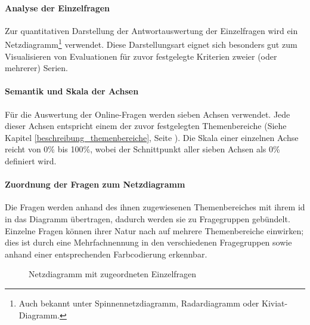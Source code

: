 \documentclass[../../main.tex]{subfiles}
\begin{document}
\paragraph*{Analyse der Einzelfragen}\mbox{}

\begin{sloppypar}
Zur quantitativen Darstellung der Antwortauswertung der Einzelfragen wird ein Netzdiagramm\footnote{Auch bekannt unter Spinnennetzdiagramm, Radardiagramm oder Kiviat-Diagramm.} verwendet. Diese Darstellungsart eignet sich besonders gut zum Visualisieren von Evaluationen für zuvor festgelegte Kriterien zweier (oder mehrerer) Serien. 
\end{sloppypar}


\paragraph*{Semantik und Skala der Achsen}\mbox{}

\begin{sloppypar}
Für die Auswertung der Online-Fragen werden sieben Achsen verwendet. Jede dieser Achsen entspricht einem der zuvor festgelegten Themenbereiche (Siehe Kapitel \ref{beschreibung_themenbereiche}, Seite \pageref{beschreibung_themenbereiche}). Die Skala einer einzelnen Achse reicht von 0\% bis 100\%, wobei der Schnittpunkt aller sieben Achsen als 0\% definiert wird.\footnotemark
\end{sloppypar}


\paragraph*{Zuordnung der Fragen zum Netzdiagramm}\mbox{}

\begin{sloppypar}
Die Fragen werden anhand des ihnen zugewiesenen Themenbereiches mit ihrem \acrfull{id} in das Diagramm übertragen, dadurch werden sie zu Fragegruppen gebündelt. Einzelne Fragen können ihrer Natur nach auf mehrere Themenbereiche einwirken; dies ist durch eine Mehrfachnennung in den verschiedenen Fragegruppen sowie anhand einer entsprechenden Farbcodierung erkennbar.
\end{sloppypar}

\begin{figure}[H]
 \centering
    
 \caption{Netzdiagramm mit zugeordneten Einzelfragen}
 \label{Netzdiagramm Schema fragepositionen}
\end{figure}
\end{document}
